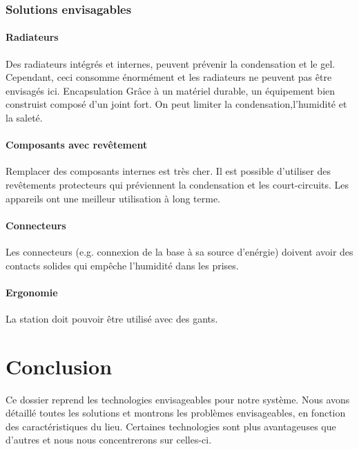 
\subsubsection{Solutions envisagables}

\paragraph{Radiateurs}

Des radiateurs intégrés et internes, peuvent prévenir la condensation et le gel. Cependant, ceci consomme énormément et les radiateurs ne peuvent pas être envisagés ici.
Encapsulation
Grâce à un matériel durable, un équipement bien construist composé d’un joint fort. On peut limiter la condensation,l’humidité et la saleté.

\paragraph{Composants avec revêtement}

Remplacer des composants internes est très cher. Il est possible d’utiliser des revêtements protecteurs qui préviennent la condensation et les court-circuits. Les appareils ont une meilleur utilisation à long terme.

\paragraph{Connecteurs}

Les connecteurs (e.g. connexion de la base à sa source d'enérgie) doivent avoir des contacts solides qui empêche l’humidité dans les prises.

\paragraph{Ergonomie}

La station doit pouvoir être utilisé avec des gants.

\section{Conclusion}

Ce dossier reprend les technologies envisageables pour notre système. Nous avons détaillé toutes les solutions et montrons les problèmes envisageables, en fonction des caractéristiques du lieu. Certaines technologies sont plus avantageuses que d'autres et nous nous concentrerons sur celles-ci.